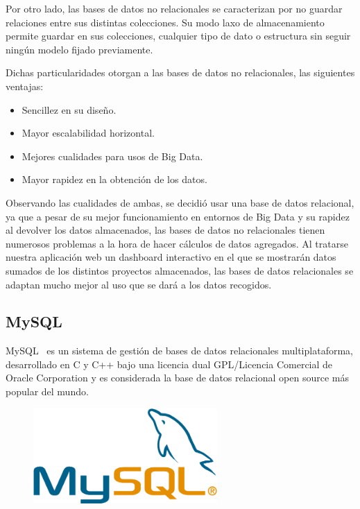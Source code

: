 \documentclass[a4paper, spanish, 12pt]{book}
\begin{document}
Por otro lado, las bases de datos no relacionales se caracterizan por no guardar
relaciones entre sus distintas colecciones. Su modo laxo de almacenamiento permite
guardar en sus colecciones, cualquier tipo de dato o estructura sin seguir
ning\'un modelo fijado previamente.

Dichas particularidades otorgan a las bases de datos no relacionales, las siguientes
ventajas:

\begin{itemize}

\item Sencillez en su dise\~no.

\item Mayor escalabilidad horizontal.

\item Mejores cualidades para usos de Big Data.

\item Mayor rapidez en la obtenci\'on de los datos.

\end{itemize}

Observando las cualidades de ambas, se decidi\'o usar una base de datos relacional,
ya que a pesar de su mejor funcionamiento en entornos de Big Data y su rapidez al
devolver los datos almacenados, las bases de datos no relacionales tienen numerosos
problemas a la hora de hacer c\'alculos de datos agregados. Al tratarse nuestra
aplicaci\'on web un dashboard interactivo en el que se mostrar\'an datos sumados de
los distintos proyectos almacenados, las bases de datos relacionales se adaptan mucho
mejor al uso que se dar\'a a los datos recogidos.

\subsection{MySQL}
\label{subsec:mysql}

MySQL~\cite{mysql} es un sistema de gesti\'on de bases de datos relacionales multiplataforma,
desarrollado en C y C++ bajo una licencia dual GPL/Licencia Comercial de Oracle
Corporation y es considerada la base de datos relacional open source m\'as popular del mundo.

\begin{figure}[H]
  \centering
  \includegraphics[width=7cm, keepaspectratio]{img/mysql-logo}
\end{figure}
\end{document}
